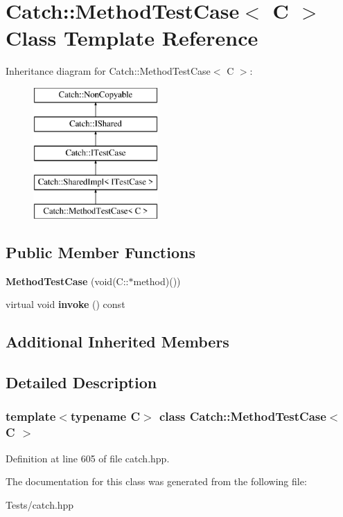 \hypertarget{class_catch_1_1_method_test_case}{}\section{Catch\+:\+:Method\+Test\+Case$<$ C $>$ Class Template Reference}
\label{class_catch_1_1_method_test_case}
Inheritance diagram for Catch\+:\+:Method\+Test\+Case$<$ C $>$\+:\begin{figure}[H]
\begin{center}
\leavevmode
\includegraphics[height=5.000000cm]{class_catch_1_1_method_test_case}
\end{center}
\end{figure}
\subsection*{Public Member Functions}
\begin{DoxyCompactItemize}
\item 
\mbox{\label{class_catch_1_1_method_test_case_a7b043b85dae371358255dd9dc6582e7b}} 
{\bfseries Method\+Test\+Case} (void(C\+::$\ast$method)())
\item 
\mbox{\label{class_catch_1_1_method_test_case_a4e2263cfa0646f2980768328cb372793}} 
virtual void {\bfseries invoke} () const
\end{DoxyCompactItemize}
\subsection*{Additional Inherited Members}


\subsection{Detailed Description}
\subsubsection*{template$<$typename C$>$\newline
class Catch\+::\+Method\+Test\+Case$<$ C $>$}



Definition at line 605 of file catch.\+hpp.



The documentation for this class was generated from the following file\+:\begin{DoxyCompactItemize}
\item 
Tests/catch.\+hpp\end{DoxyCompactItemize}
